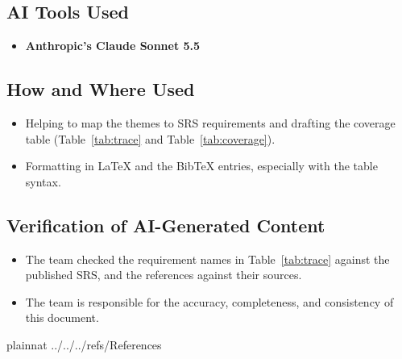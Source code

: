 \documentclass{article}
\begin{document}
    \subsection{AI Tools Used}

    \begin{itemize}
        \item \textbf{Anthropic's Claude Sonnet 5.5}
    \end{itemize}

    \subsection{How and Where Used}

    \begin{itemize}
        \item Helping to map the themes to SRS requirements and drafting the coverage table (Table~\ref{tab:trace} and
        Table~\ref{tab:coverage}).
        \item Formatting in \LaTeX{} and the BibTeX entries, especially with the table syntax.
    \end{itemize}

    \subsection{Verification of AI-Generated Content}

    \begin{itemize}
        \item The team checked the requirement names in Table~\ref{tab:trace} against the published SRS, and the
        references against their sources.
        \item The team is responsible for the accuracy, completeness, and consistency of this document.
    \end{itemize}

     {plainnat}
     {../../../refs/References}
\end{document}
